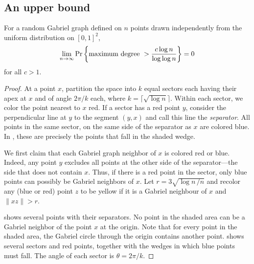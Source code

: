 \documentclass[lotsofwhite,charterfonts]{patmorin}
\newcommand{\PROB}{\Pr}
\begin{document}
\subsection{An upper bound}

\begin{thm}
For a random Gabriel graph defined on $n$ points drawn
independently from the uniform distribution on
$[0,1]^2$, 
\[
\lim_{n\to\infty} \PROB \left\{ \hbox{\rm maximum degree}~> {c \log n \over
\log \log n} \right\} = 0
\]
for all $c > 1$.
\end{thm}

\begin{proof}
At a point $x$, partition the space into $k$ equal sectors each having
their apex at $x$ and of angle $2\pi/k$ each, where $k = \lceil \sqrt{\log
n} \rceil$.  Within each sector, we color the point nearest to $x$ red.
If a sector has a red point $y$, consider the perpendicular line at
$y$ to the segment $(y,x)$ and call this line the \emph{separator}.
All points in the same sector, on the same side of the separator as $x$
are colored blue.  In , these are precisely the points
that fall in the shaded wedge.

We first claim that each Gabriel graph neighbor of $x$ is colored red
or blue.  Indeed, any point $y$ excludes all points at the other side
of the separator---the side that does not contain $x$.  Thus, if there
is a red point in the sector, only blue points can possibly be Gabriel
neighbors of $x$.  Let $r = 3\sqrt{\log n\,/n}$ and recolor any (blue or red)
point $z$ to be yellow if it is a Gabriel neighbour of $x$ and $\|xz\|
> r$.

 shows several points with their separators.
No point in the shaded area can be a Gabriel neighbor of the point $x$ at the
origin. Note that for every point in the shaded area, the Gabriel circle
through the origin contains another point.
shows several sectors and red points, together
with the wedges in which blue points must
fall. The angle of each sector is $\theta = 2\pi / k$.


\end{proof}
\end{document}
